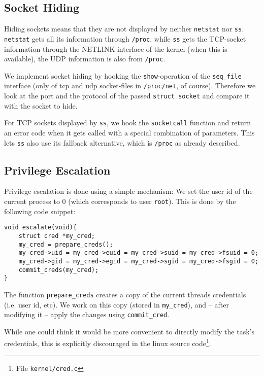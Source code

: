 \documentclass[10pt, letterpaper]{article}
\begin{document}
\subsection{Socket Hiding}

Hiding sockets means that they are not displayed by neither \texttt{netstat} nor \texttt{ss}. \texttt{netstat} gets all its information through \texttt{/proc}, while \texttt{ss} gets the TCP-socket information through the NETLINK interface of the kernel (when this is available), the UDP information is also from \texttt{/proc}.

We implement socket hiding by hooking the \texttt{show}-operation of the \texttt{seq\_file} interface (only of tcp and udp socket-files in \texttt{/proc/net}, of course). Therefore we look at the port and the protocol of the passed \texttt{struct socket} and compare it with the socket to hide.

For TCP sockets displayed by \texttt{ss}, we hook the \texttt{socketcall} function and return an error code when it gets called with a special combination of parameters. This lets \texttt{ss} also use its fallback alternative, which is \texttt{/proc} as already described.

\subsection{Privilege Escalation}

Privilege escalation is done using a simple mechanism: We set the user id of the current process to 0 (which corresponds to user \texttt{root}). This is done by the following code snippet:

\begin{verbatim}
void escalate(void){
    struct cred *my_cred;
    my_cred = prepare_creds(); 
    my_cred->uid = my_cred->euid = my_cred->suid = my_cred->fsuid = 0;
    my_cred->gid = my_cred->egid = my_cred->sgid = my_cred->fsgid = 0;
    commit_creds(my_cred);
}
\end{verbatim}

The function \texttt{prepare\_creds} creates a copy of the current threads credentials (i.e. user id, etc). We work on this copy (stored in \texttt{my\_cred}), and -- after modifying it -- apply the changes using \texttt{commit\_cred}.

While one could think it would be more convenient to directly modify the task's credentials, this is explicitly discouraged in the linux source code\footnote{File \texttt{kernel/cred.c}}.
\end{document}
